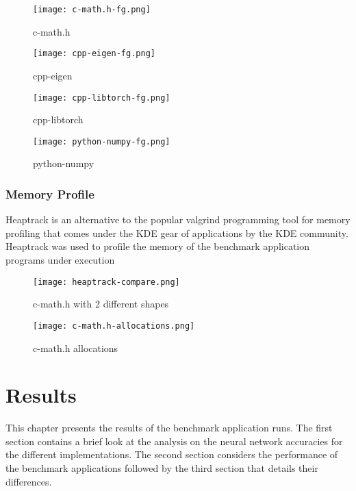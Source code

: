 \begin{figure}[ht]
	\centering
	\texttt{[image: c-math.h-fg.png]}
	\caption{c-math.h}
\end{figure}

\begin{figure}[ht]
	\centering
	\texttt{[image: cpp-eigen-fg.png]}
	\caption{cpp-eigen}
\end{figure}

\begin{figure}[ht]
	\centering
	\texttt{[image: cpp-libtorch-fg.png]}
	\caption{cpp-libtorch}
\end{figure}

\begin{figure}[ht]
	\centering
	\texttt{[image: python-numpy-fg.png]}
	\caption{python-numpy}
\end{figure}

\subsection{Memory Profile}

Heaptrack is an alternative to the popular valgrind programming tool for memory profiling that comes under the KDE gear of applications by the KDE community. Heaptrack was used to profile the memory of the benchmark application programs under execution

\begin{figure}[ht]
	\centering
	\texttt{[image: heaptrack-compare.png]}
	\caption{c-math.h with 2 different shapes}
\end{figure}

\begin{figure}[ht]
	\centering
	\texttt{[image: c-math.h-allocations.png]}
	\caption{c-math.h allocations}
\end{figure}


\chapter{Results}

This chapter presents the results of the benchmark application runs. The first section contains a brief look at the analysis on the neural network accuracies for the different implementations. The second section considers the performance of the benchmark applications followed by the third section that details their differences.

